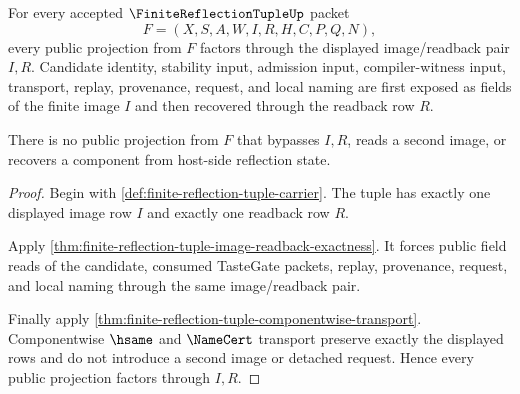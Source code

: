 \begin{theorem}
\label{thm:finite-reflection-tuple-public-projection-route}
For every accepted $\FiniteReflectionTupleUp$ packet
$$
F=(X,S,A,W,I,R,H,C,P,Q,N),
$$
every public projection from $F$ factors through the displayed image/readback pair $I,R$. Candidate identity, stability input, admission input, compiler-witness input, transport, replay, provenance, request, and local naming are first exposed as fields of the finite image $I$ and then recovered through the readback row $R$.

There is no public projection from $F$ that bypasses $I,R$, reads a second image, or recovers a component from host-side reflection state.
\end{theorem}
\begin{proof}
Begin with \autoref{def:finite-reflection-tuple-carrier}. The tuple has exactly one displayed image row $I$ and exactly one readback row $R$.

Apply \autoref{thm:finite-reflection-tuple-image-readback-exactness}. It forces public field reads of the candidate, consumed TasteGate packets, replay, provenance, request, and local naming through the same image/readback pair.

Finally apply \autoref{thm:finite-reflection-tuple-componentwise-transport}. Componentwise $\hsame$ and $\NameCert$ transport preserve exactly the displayed rows and do not introduce a second image or detached request. Hence every public projection factors through $I,R$.
\end{proof}

